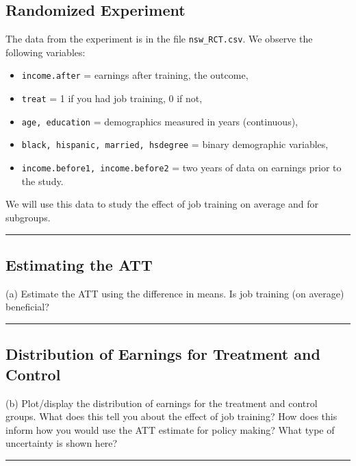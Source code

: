 \documentclass{article}
\newenvironment{colorparagraph}[1]{\par\color{#1}}{\par}
\begin{document}
\begin{colorparagraph}{questioncolor}
\label{q41}\subsection*{Randomized Experiment}
The data from the experiment is in the file \texttt{nsw\_RCT.csv}. We observe the following variables:

\begin{itemize}
  \item \texttt{income.after} = earnings after training, the outcome,
  \item \texttt{treat} = 1 if you had job training, 0 if not,
  \item \texttt{age, education} = demographics measured in years (continuous),
  \item \texttt{black, hispanic, married, hsdegree} = binary demographic variables,
  \item \texttt{income.before1, income.before2} = two years of data on earnings prior to the study.
\end{itemize}

We will use this data to study the effect of job training on average and for subgroups.

\rule{\textwidth}{0.5pt}
\end{colorparagraph}

\begin{colorparagraph}{questioncolor}
\label{q4b}\subsection{Estimating the ATT}
(a) Estimate the ATT using the difference in means. Is job training (on average) beneficial?

\rule{\textwidth}{0.5pt}
\end{colorparagraph}

\begin{colorparagraph}{questioncolor}
\label{q4c}\subsection{Distribution of Earnings for Treatment and Control}
(b) Plot/display the distribution of earnings for the treatment and control groups. What does this tell you about the effect of job training? How does this inform how you would use the ATT estimate for policy making? What type of uncertainty is shown here?

\rule{\textwidth}{0.5pt}
\end{colorparagraph}
\end{document}
